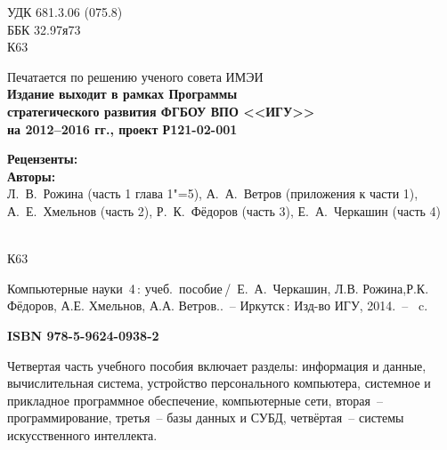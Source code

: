 \documentclass[a4paper,14pt, openany, twoside, draft]{extbook} %
\begin{document}
\newpage
\begin{mygroup}
\thispagestyle{empty}
\noindent УДК 681.3.06 (075.8)\\ %
\noindent ББК 32.97я73\\
\noindent\mbox{}\hspace{2em}К63
\begin{center}\small
Печатается по решению ученого совета ИМЭИ\\[2ex]
\bfseries Издание выходит в рамках Программы\\
стратегического развития ФГБОУ ВПО <<ИГУ>>\\
на 2012--2016 гг., проект Р121-02-001
\end{center}
\vspace{0.5ex}
\begin{center}\small
  \textbf{Рецензенты:} \\
  \textbf{Авторы:}\\
  Л.~В.~Рожина (часть 1 глава 1"=5), А.~А.~Ветров (приложения к части 1),\\
  А.~Е.~Хмельнов (часть 2), Р.~К.~Фёдоров (часть 3), Е.~А.~Черкашин (часть 4)
\end{center}
\vfill
\noindent\begin{minipage}[t]{2em}
\noindent\mbox{}\\
К63
\end{minipage}%
\begin{minipage}[t]{0.95\linewidth}
\setlength{\parindent}{5ex}

Компьютерные науки~4\,{}: учеб.~пособие\,/~Е.~А.~Черкашин, Л.В. Рожина,Р.К. Фёдоров, А.Е. Хмельнов, А.А. Ветров..~-- Иркутск\,: Изд-во ИГУ, 2014.~-- \pageref{lastpage}~c.

{\bfseries ISBN 978-5-9624-0938-2}
\vspace{2ex}

\begingroup\footnotesize\parskip0pt
\vspace{1ex}


Четвертая часть учебного пособия включает разделы: информация и данные, вычислительная система, устройство персонального компьютера, системное и прикладное программное обеспечение, компьютерные сети, вторая~--  программирование, третья~-- базы данных и СУБД, четвёртая~-- системы искусственного интеллекта.


\end{minipage}
\end{mygroup}
\end{document}
